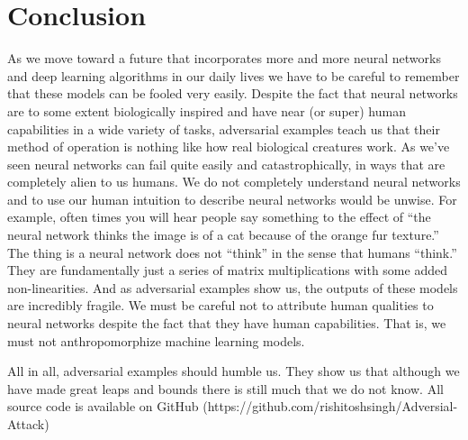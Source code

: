 \section{Conclusion}

    As we move toward a future that incorporates more and more neural networks and deep learning algorithms in our daily lives we have to be careful to remember that these models can be fooled very easily. Despite the fact that neural networks are to some extent biologically inspired and have near (or super) human capabilities in a wide variety of tasks, adversarial examples teach us that their method of operation is nothing like how real biological creatures work. As we’ve seen neural networks can fail quite easily and catastrophically, in ways that are completely alien to us humans.
    We do not completely understand neural networks and to use our human intuition to describe neural networks would be unwise. For example, often times you will hear people say something to the effect of “the neural network thinks the image is of a cat because of the orange fur texture.” The thing is a neural network does not “think” in the sense that humans “think.” They are fundamentally just a series of matrix multiplications with some added non-linearities. And as adversarial examples show us, the outputs of these models are incredibly fragile. We must be careful not to attribute human qualities to neural networks despite the fact that they have human capabilities. That is, we must not anthropomorphize machine learning models.

    All in all, adversarial examples should humble us. They show us that although we have made great leaps and bounds there is still much that we do not know.
    All source code is available on GitHub (https://github.com/rishitoshsingh/Adversial-Attack)
